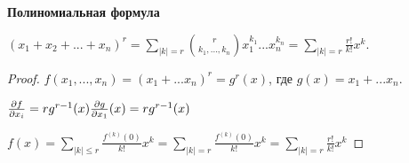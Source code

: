 \begin{statement}
    \textbf{Полиномиальная формула}
    
    $(x_1+x_2+...+x_n)^r=\sum\limits_{|k|=r}\binom{r}{k_1, ..., k_n}x_1^{k_1}...x_n^{k_n}=\sum\limits_{|k|=r}\frac{r!}{k!}x^k$.
\end{statement}

\begin{proof}
    $f(x_1, ..., x_n)=(x_1+...x_n)^r=g^r(x)$, где $g(x)=x_1+...x_n$.

    $\pdv{f}{x_i}=rg^{r-1}(x)\frac{\partial g}{\partial x_1}(x)=rg^{r-1}(x)$

    $f(x)=\sum\limits_{|k|\leq r}\frac{f^{(k)}(0)}{k!}x^k=\sum\limits_{|k|=r}\frac{f^{(k)}(0)}{k!}x^k=\sum\limits_{|k|=r}\frac{r!}{k!}x^k$
\end{proof}